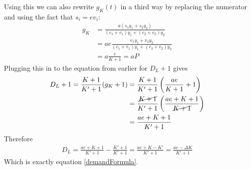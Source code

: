 \documentclass{article}
\theoremstyle{theorem}
\begin{document}
Using this we can also rewrite $g_K(t)$ in a third way by replacing the numerator and using the fact that $s_i = e v_i$:
\begin{align}
	g_K &= \frac{a(s_1 y_1 + s_2 y_2)}{(c_1 + v_1)y_1 + (c_2 + v_2)y_2} \\
	&= ae \frac{v_1 y_1 + v_2 y_2}{(c_1 + v_1) y_1 + (c_2 + v_2)y_2} \\
	&= a\frac{e}{K+1} = a P
\end{align} 
Plugging this in to the equation from earlier for $D_L+1$ gives
\begin{align}
	D_L+1 = \frac{K+1}{K'+1}(g_K+1) &= \frac{K+1}{K'+1}\left( \frac{ae}{K+1} + 1 \right)\\
	 &= \frac{\cancel{K+1}}{K'+1}\left( \frac{ae + K +1}{\cancel{K+1}} \right) \\
	 &= \frac{ae+K+1}{K'+1}
\end{align}
Therefore 
\begin{align}
	D_L = \frac{ae+K+1}{K'+1} - \frac{K'+1}{K'+1} = \frac{ae+K-K'}{K'+1} = \frac{ae-\Delta K}{K'+1}
\end{align}
Which is exactly equation \ref{demandFormula}.
\end{document}
